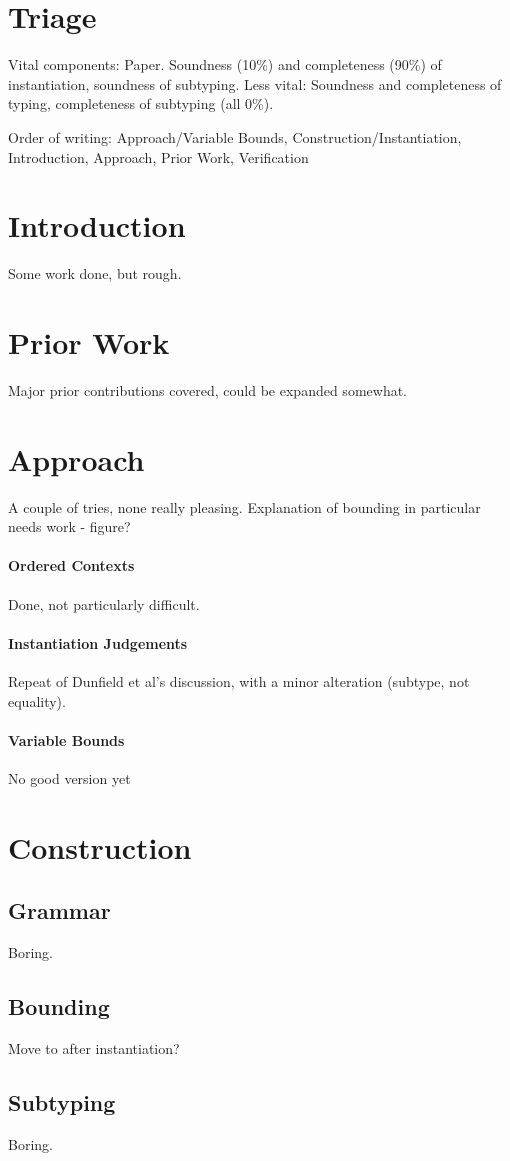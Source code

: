 \documentclass{report}
\begin{document}
\section{Triage}
Vital components: Paper. Soundness (10\%) and completeness (90\%) of instantiation, soundness of subtyping.
Less vital: Soundness and completeness of typing, completeness of subtyping (all 0\%).


Order of writing: Approach/Variable Bounds, Construction/Instantiation, Introduction, Approach, Prior Work, Verification
\section{Introduction}
Some work done, but rough.
\section{Prior Work}
Major prior contributions covered, could be expanded somewhat.
\section{Approach}
A couple of tries, none really pleasing. Explanation of bounding in particular needs work - figure?
\paragraph{Ordered Contexts}
Done, not particularly difficult.
\paragraph{Instantiation Judgements}
Repeat of Dunfield et al's discussion, with a minor alteration (subtype, not equality).
\paragraph{Variable Bounds}
No good version yet
\section{Construction}
\subsection{Grammar}
Boring.
\subsection{Bounding}
Move to after instantiation?
\subsection{Subtyping}
Boring.
\end{document}
